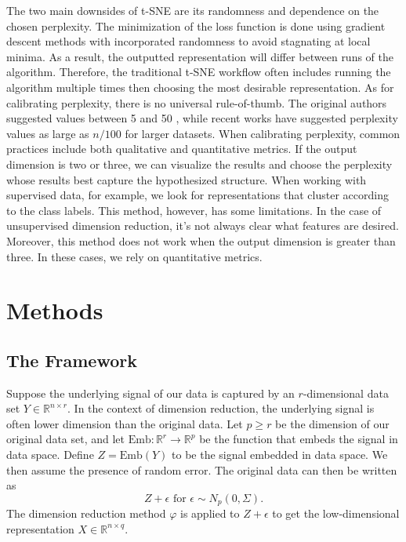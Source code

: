 \documentclass{article}
\begin{document}
\bigbreak The two main downsides of t-SNE are its randomness and dependence on the chosen perplexity. The minimization of the loss function is done using gradient descent methods with incorporated randomness to avoid stagnating at local minima. As a result, the outputted representation will differ between runs of the algorithm. Therefore, the traditional t-SNE workflow often includes running the algorithm multiple times then choosing the most desirable representation. As for calibrating perplexity, there is no universal rule-of-thumb. The original authors suggested values between 5 and 50 \cite{t-SNE}, while recent works have suggested perplexity values as large as $n/100$ \cite{t-SNE cell} for larger datasets. When calibrating perplexity, common practices include both qualitative and quantitative metrics. If the output dimension is two or three, we can visualize the results and choose the perplexity whose results best capture the hypothesized structure. When working with supervised data, for example, we look for representations that cluster according to the class labels. This method, however, has some limitations. In the case of unsupervised dimension reduction, it's not always clear what features are desired. Moreover, this method does not work when the output dimension is greater than three. In these cases, we rely on quantitative metrics.

\section{Methods}

\subsection{The Framework}
Suppose the underlying signal of our data is captured by an $r$-dimensional data set $Y \in \mathbb{R}^{n \times r}$. In the context of dimension reduction, the underlying signal is often lower dimension than the original data. Let $p \geq r$ be the dimension of our original data set, and let $\textrm{Emb}:\mathbb{R}^r \to \mathbb{R}^p$ be the function that embeds the signal in data space. Define $Z = \textrm{Emb}(Y)$ to be the signal embedded in data space. We then assume the presence of random error. The original data can then be written as $$Z + \epsilon \textrm{ for } \epsilon \sim N_p(0, \Sigma).$$ The dimension reduction method $\varphi$ is applied to $Z + \epsilon$ to get the low-dimensional representation $X \in \mathbb{R}^{n \times q}$.
\end{document}
